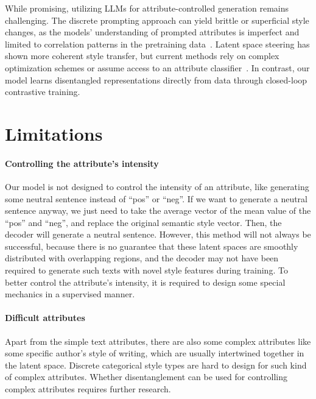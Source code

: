 \documentclass[11pt,a4paper]{article}
\renewcommand{\cite}{\citep}
\begin{document}
While promising, utilizing LLMs for attribute-controlled generation remains challenging. The discrete prompting approach can yield brittle or superficial style changes, as the models' understanding of prompted attributes is imperfect and limited to correlation patterns in the pretraining data~\cite{reif2021recipe,luo2023prompt}. Latent space steering has shown more coherent style transfer, but current methods rely on complex optimization schemes or assume access to an attribute classifier~\cite{john-etal-2019-disentangled,sha2021multi}. In contrast, our model learns disentangled representations directly from data through closed-loop contrastive training.


\section{Limitations}
\paragraph{Controlling the attribute's intensity}

Our model is not designed to control the  intensity of an attribute, like generating  some neutral sentence instead of ``pos'' or ``neg''. If we want to generate a neutral sentence anyway, we just need to take the average vector of the mean value of the ``pos'' and ``neg'', and replace the original semantic style vector. Then, the decoder will generate a neutral sentence. However, this method will not always be successful,  because there is no guarantee that these latent spaces are smoothly distributed with overlapping regions, and the decoder may not have been required to generate such texts with novel style features during training. To better control the attribute's intensity, it is required to design some special mechanics in a supervised manner.


\paragraph{Difficult attributes}

Apart from the simple text attributes, there are also some complex attributes like some specific author's style of writing, which are usually intertwined together in the latent space. Discrete categorical style types are hard to design for such kind of complex attributes. Whether disentanglement can be used for controlling complex attributes requires further research.
\end{document}
